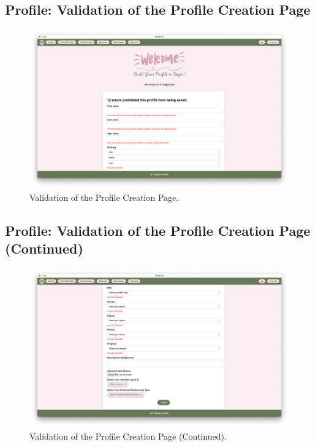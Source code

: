         \newpage
        \subsection{Profile: Validation of the Profile Creation Page}
        \begin{figure}[h]
                \centering
                \captionsetup{justification=centering, singlelinecheck=false, labelsep=space}
                \includegraphics[width=5in]{figures/results/profiles/create-profile-error.png} 
                \caption{Validation of the Profile Creation Page.}
                \label{fig:create-profile-error}
            \end{figure}

        \subsection{Profile: Validation of the Profile Creation Page (Continued)}
        \begin{figure}[h]
                \centering
                \captionsetup{justification=centering, singlelinecheck=false, labelsep=space}
                \includegraphics[width=5in]{figures/results/profiles/create-profile-error2.png} 
                \caption{Validation of the Profile Creation Page (Continued).}
                \label{fig:create-profile-error2}
            \end{figure}

